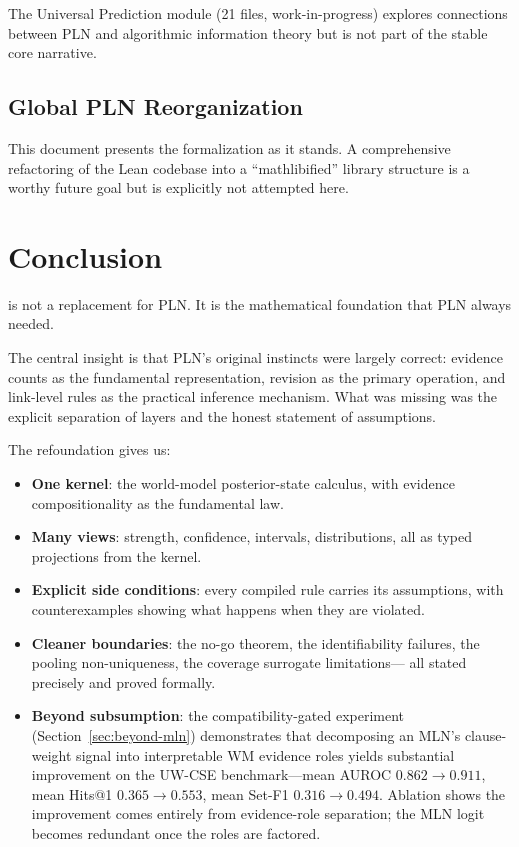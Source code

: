 \documentclass[11pt,openany]{report}
\begin{document}
The Universal Prediction module (21 files, work-in-progress) explores
connections between PLN and algorithmic information theory but is not
part of the stable core narrative.

\section{Global PLN Reorganization}

This document presents the formalization as it stands.  A comprehensive
refactoring of the Lean codebase into a ``mathlibified'' library
structure is a worthy future goal but is explicitly not attempted here.



\chapter{Conclusion}
\label{ch:conclusion}

\xiPLN{} is not a replacement for PLN.  It is the mathematical foundation
that PLN always needed.

The central insight is that PLN's original instincts were largely correct:
evidence counts as the fundamental representation, revision as the primary
operation, and link-level rules as the practical inference mechanism.  What
was missing was the explicit separation of layers and the honest statement
of assumptions.

The refoundation gives us:
\begin{itemize}
\item \textbf{One kernel}: the world-model posterior-state calculus, with
  evidence compositionality as the fundamental law.
\item \textbf{Many views}: strength, confidence, intervals, distributions,
  all as typed projections from the kernel.
\item \textbf{Explicit side conditions}: every compiled rule carries its
  assumptions, with counterexamples showing what happens when they are
  violated.
\item \textbf{Cleaner boundaries}: the no-go theorem, the identifiability
  failures, the pooling non-uniqueness, the coverage surrogate limitations---
  all stated precisely and proved formally.
\item \textbf{Beyond subsumption}: the compatibility-gated experiment
  (Section~\ref{sec:beyond-mln}) demonstrates that decomposing an MLN's
  clause-weight signal into interpretable WM evidence roles yields
  substantial improvement on the UW-CSE benchmark---mean
  AUROC $0.862 \to 0.911$, mean Hits@1 $0.365 \to 0.553$,
  mean Set-F1 $0.316 \to 0.494$.  Ablation shows the improvement comes
  entirely from evidence-role separation; the MLN logit becomes redundant
  once the roles are factored.
\end{itemize}
\end{document}
